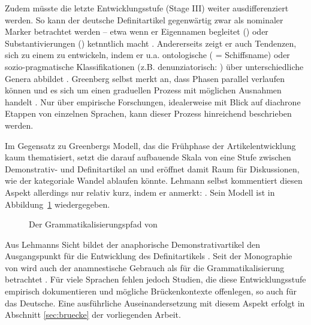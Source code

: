 Zudem müsste die letzte Entwicklungsstufe (Stage III) weiter ausdifferenziert werden. So kann der deutsche Definitartikel gegenwärtig zwar als nominaler Marker betrachtet werden -- etwa wenn er Eigennamen begleitet () oder Substantivierungen () ketnntlich macht \parencite[71]{Szczepaniak2011a}. Andererseits zeigt er auch Tendenzen, sich zu einem  zu entwickeln, indem er u.a. ontologische ( = Schiffsname) oder sozio-pragmatische Klassifikationen (z.B. denunziatorisch: ) über unterschiedliche Genera abbildet \parencite{Nubling2014}. Greenberg selbst merkt an, dass Phasen parallel verlaufen können und es sich um einen graduellen Prozess mit möglichen Ausnahmen handelt \parencite[61]{Greenberg1978}. Nur über empirische Forschungen, idealerweise mit Blick auf diachrone Etappen von einzelnen Sprachen, kann dieser Prozess hinreichend beschrieben werden. 

Im Gegensatz zu Greenbergs Modell, das die Frühphase der Artikelentwicklung kaum thematisiert, setzt die darauf aufbauende Skala von \textcite{Lehmann2015} eine Stufe zwischen  Demonstrativ- und Definitartikel an und eröffnet damit Raum für Diskussionen, wie der kategoriale Wandel ablaufen könnte. Lehmann selbst kommentiert diesen Aspekt allerdings nur relativ kurz, indem er anmerkt: \parencite[41]{Lehmann2015}. Sein Modell ist in Abbildung~\ref{abb:lehmann} wiedergegeben. 

\begin{figure}
\caption {Der Grammatikalisierungspfad von \textcite[59]{Lehmann2015}\label{abb:lehmann}}
\end{figure}

Aus Lehmanns Sicht bildet der anaphorische Demonstrativartikel den Ausgangspunkt für die Entwicklung des Definitartikels \parencite[ebenso:][]{Greenberg1978,Lyons1999}. Seit der Monographie von \textcite{Himmelmann1997} wird auch der anamnestische Gebrauch als  für die Grammatikalisierung \parencite[74]{Szczepaniak2011a} betrachtet \parencite[s. hierzu auch den Überblick in][527]{deMulder2011}. Für viele Sprachen fehlen jedoch Studien, die diese Entwicklungsstufe empirisch dokumentieren und mögliche  Brückenkontexte \parencite[84]{Heine2002a} offenlegen, so auch für das Deutsche. Eine ausführliche  Auseinandersetzung mit diesem Aspekt erfolgt in Abschnitt \ref{sec:bruecke} der vorliegenden Arbeit.

